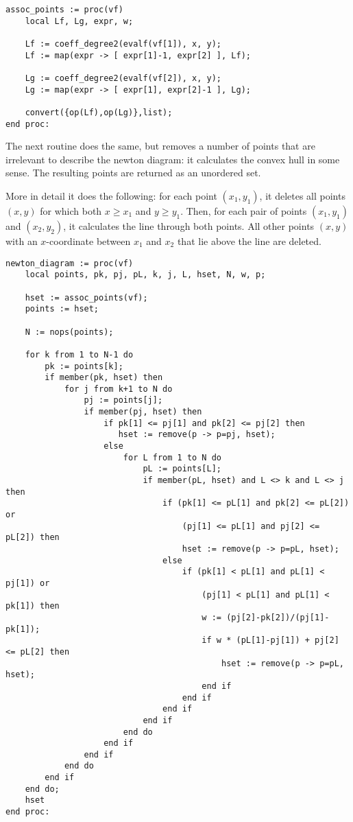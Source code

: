 \documentclass[a4paper,10pt]{article}
\begin{document}
\begin{lstlisting}[name=blowup]
assoc_points := proc(vf)
    local Lf, Lg, expr, w;

    Lf := coeff_degree2(evalf(vf[1]), x, y);
    Lf := map(expr -> [ expr[1]-1, expr[2] ], Lf);

    Lg := coeff_degree2(evalf(vf[2]), x, y);
    Lg := map(expr -> [ expr[1], expr[2]-1 ], Lg);

    convert({op(Lf),op(Lg)},list);
end proc:
\end{lstlisting}

The next routine does the same, but removes a number of points that are irrelevant to describe the
newton diagram: it calculates the convex hull in some sense.  The resulting points are returned
as an unordered set.
\medskip

\noindent More in detail it does the following:  for each point $(x_1,y_1)$, it deletes all points $(x,y)$
for which both $x\geq x_1$ and $y\geq y_1$.  Then, for each pair of points $(x_1,y_1)$ and
$(x_2,y_2)$, it calculates the line through both points.  All other points $(x,y)$ with an $x$-coordinate
between $x_1$ and $x_2$ that lie above the line are deleted.

\begin{lstlisting}[name=blowup]
newton_diagram := proc(vf)
    local points, pk, pj, pL, k, j, L, hset, N, w, p;

    hset := assoc_points(vf);
    points := hset;

    N := nops(points);

    for k from 1 to N-1 do
        pk := points[k];
        if member(pk, hset) then
            for j from k+1 to N do
                pj := points[j];
                if member(pj, hset) then
                    if pk[1] <= pj[1] and pk[2] <= pj[2] then
                       hset := remove(p -> p=pj, hset);
                    else
                        for L from 1 to N do
                            pL := points[L];
                            if member(pL, hset) and L <> k and L <> j then
                                if (pk[1] <= pL[1] and pk[2] <= pL[2]) or
                                    (pj[1] <= pL[1] and pj[2] <= pL[2]) then
                                    hset := remove(p -> p=pL, hset);
                                else
                                    if (pk[1] < pL[1] and pL[1] < pj[1]) or
                                        (pj[1] < pL[1] and pL[1] < pk[1]) then
                                        w := (pj[2]-pk[2])/(pj[1]-pk[1]);
                                        if w * (pL[1]-pj[1]) + pj[2] <= pL[2] then
                                            hset := remove(p -> p=pL, hset);
                                        end if
                                    end if
                                end if
                            end if
                        end do
                    end if
                end if
            end do
        end if
    end do;
    hset
end proc:
\end{lstlisting}
\end{document}
